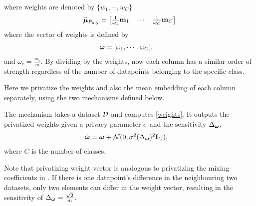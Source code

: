 \documentclass{article}
\begin{document}
%
%
where weights are denoted by $\{w_1, \cdots, w_C\}$
\begin{align}
 \widetilde{\mathbf{\bm{\mu}}}_{P_{\mathbf{x}, \mathbf{y}}} 
 =
    \begin{bmatrix}
 \frac{1}{\omega_1}\mathbf{m}_1 & \cdots  &  \frac{1}{\omega_C} \mathbf{m}_C  \nonumber \\
\end{bmatrix}
\end{align}\label{eq:rfME_weighted} where the vector of weights is defined by 
\begin{align}\label{eq:weights}
    \bm{\omega} &= [\omega_1, \cdots, \omega_C  ], 
\end{align} and $\omega_c = \frac{m_c}{m}$. By dividing by the weights, now each column has a similar order of strength regardless of the number of datapoints belonging to the specific class.  

Here we privatize the weights and also the mean embedding of each column separately, using the two mechanisms defined below.

\begin{defn}\label{defn:DP_weights}
The mechanism takes a dataset $\mathcal{D}$ and computes \eqref{weights}. It outputs the privatized weights given a privacy parameter $\sigma$ and the sensitivity $\Delta_{\bm{\omega}}$, 
\begin{align}\label{eq:privatize_weights}
    \tilde{\bm{\omega}} &= \bm{\omega} +  \mathcal{N}(0, \sigma^2 (\Delta_{\bm{\omega}})^2 \mathbf{I}_C),
\end{align} where $C$ is the number of classes. 
\end{defn}
Note that privatizing weight vector is analogous to privatizing the mixing coefficients in \cite{pmlr-v54-park17c}. If there is one datapoint's difference in the neighbouring two datasets, only two elements can differ in the weight vector, resulting in the sensitivity of $\Delta_{\bm{\omega}} = \frac{\sqrt{2}}{m}$.
\end{document}
